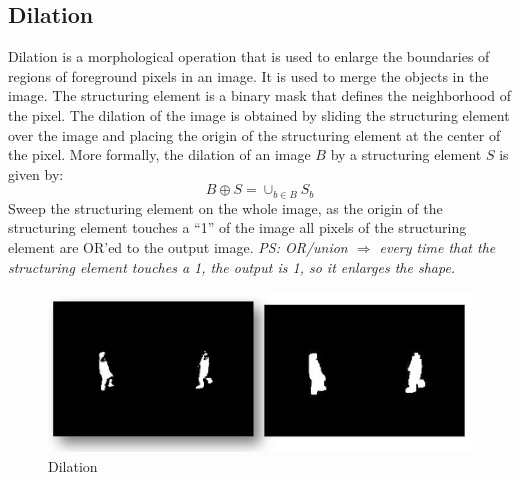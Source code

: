 \subsection{Dilation}
Dilation is a morphological operation that is used to enlarge the boundaries of regions of foreground pixels in an image. It is used to merge the objects in the image. The structuring element is a binary mask that defines the neighborhood of the pixel. The dilation of the image is obtained by sliding the structuring element over the image and placing the origin of the structuring element at the center of the pixel. 
More formally, the dilation of an image $B$ by a structuring element $S$ is given by:
\[
    B \oplus S = \cup_{b \in B} S_b
\]
Sweep the structuring element on the whole image, as the origin of the structuring element touches a “1” of the image all pixels of the structuring element are OR’ed to the output image. 
\textit{PS: OR/union $\Rightarrow$ every time that the structuring element touches a 1, the output is 1, so it enlarges the shape.}
\begin{figure}[h]
    \centering
    \includegraphics[scale=0.5]{Figures/Dilatation.png}
    \caption{Dilation}
    \label{fig:enter-label}
\end{figure}
